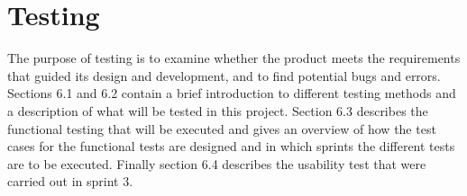 \chapter{Testing}

	The purpose of testing is to examine whether the product meets the requirements that guided its design 
	and development, and to find potential bugs and errors. Sections 6.1 and 6.2 contain a brief introduction 
	to different testing methods and a description of what will be tested in this project. Section 6.3 describes 
	the functional testing that will be executed and gives an overview of how the test cases for the functional 
	tests are designed and in which sprints the different tests are to be executed. Finally section 6.4 describes 
	the usability test that were carried out in sprint 3.